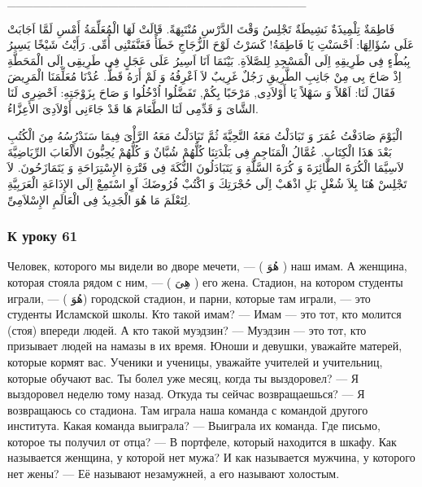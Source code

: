 \documentclass[a5paper]{article}
\begin{document}
\_\_\_\_\_\_\_\_\_\_\_\_\_\_\_\_\_\_\_\_\_\_\_\_\_\_\_\_\_\_\_\_\_\_\_

فَاطِمَةٌ تِلْمِيذَةٌ نَشِيطَةٌ تَجْلِسُ وَقْتَ الدَّرْسِ مُنْتَبِهَةً. قَالَتْ لَهَا الْمُعَلِّمَةُ أَمْسِ لَمَّا اَجَابَتْ عَلَى سُؤَالِهَا: اَحْسَنْتِ يَا فَاطِمَةُ! كَسَرْتُ لَوْحَ الزُّجَاجِ خَطَأً فَعَنَّفَتْنِى أُمِّى. رَأَيْتُ شَيْخًا يَسِيرُ بِبُطْءٍ فِى طَرِيقِهِ اِلَى الْمَسْجِدِ لِلصَّلاَةِ. بَيْنَمَا اَنَا اَسِيرُ عَلَى عَجَلٍ فِى طَرِيقِى اِلَى الْمَحَطَّةِ اِذْ صَاحَ بِى مِنْ جَانِبِ الطَّرِيقِ رَجُلٌ غَرِيبٌ لاَ اَعْرِفُهُ وَ لَمْ أَرَهُ قَطُّ. عُدْنَا مُعَلِّمَنَا الْمَرِيضَ فَقَالَ لَنَا: اَهْلاً وَ سَهْلاً يَا أَوْلاَدِى, مَرْحَبًا بِكُمْ, تَفَضَّلُوا اُدْخُلُوا وَ صَاحَ بِزَوْجَتِهِ: اَحْضِرِى لَنَا الشَّاىَ وَ قَدِّمِى لَنَا الطَّعَامَ هَا قَدْ جَاءَنِى أَوْلاَدِىَ الأَعِزَّاءُ.

الْيَوْمَ صَادَفْتُ عُمَرَ وَ تَبَادَلْتُ مَعَهُ التَّحِيَّةَ ثُمَّ تَبَادَلْتُ مَعَهُ الرَّأْىَ فِيمَا سَنَدْرُسُهُ مِنَ الْكُتُبِ بَعْدَ هَذَا الْكِتَابِ. عُمَّالُ الْمَنَاجِمِ فِى بَلْدَتِنَا كُلُّهُمْ شُبَّانٌ وَ كُلُّهُمْ يُحِبُّونَ الأَلْعَابَ الرِّيَاضِيَّةَ لاَسِيَّمَا الْكُرَةَ الطَّائِرَةَ وَ كُرَةَ السَّلَّةِ وَ يَتَبَادَلُونَ النُّكَةَ فِى فَتْرَةِ الإِسْتِرَاحَةِ وَ يَتَمَازَحُونَ. لاَ تَجْلِسْ هُنَا بِلاَ شُغْلٍ بَلِ اذْهَبْ اِلَى حُجْرَتِكَ وَ اكْتُبْ فُرُوضَكَ اَوِ اسْتَمِعْ اِلَى الإِذَاعَةِ الْعَرَبِيَّةِ لِتَعْلَمَ مَا هُوَ الْجَدِيدُ فِى الْعَالَمِ الإِسْلاَمِىِّ.

\subsubsection{К уроку 61}
Человек, которого мы видели во дворе мечети, — ( هُوَ ) наш имам. А женщина, которая стояла рядом с ним, — ( هِىَ ) его жена. Стадион, на котором студенты играли, — ( هُوَ) городской стадион, и парни, которые там играли, — это студенты Исламской школы. Кто такой имам? — Имам — это тот, кто молится (стоя) впереди людей. А кто такой муэдзин? — Муэдзин — это тот, кто призывает людей на намазы в их время. Юноши и девушки, уважайте матерей, которые кормят вас. Ученики и ученицы, уважайте учителей и учительниц, которые обучают вас. Ты болел уже месяц, когда ты выздоро­вел? — Я выздоровел неделю тому назад. Откуда ты сейчас возвращаешься? — Я возвращаюсь со стадиона. Там играла наша команда с командой другого института. Какая команда выиграла? — Выиграла их команда. Где письмо, которое ты получил от отца? — В портфеле, который находится в шкафу. Как называется женщина, у которой нет мужа? И как называется мужчина, у которого нет жены? — Её называют незамужней, а его называют холостым.
\end{document}
